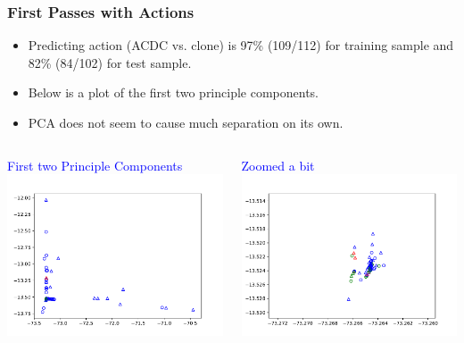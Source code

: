 \documentclass{beamer}
\begin{document}
\begin{frame}
  \frametitle{First Passes with Actions}
  \begin{itemize}
  \item Predicting action (ACDC vs. clone) is 97\% (109/112) for training sample
    and 82\% (84/102) for test sample.
  \item Below is a plot of the first two principle components.
  \item PCA does not seem to cause much separation on its own.
  \end{itemize}

  \begin{columns}
    \begin{column}{0.5\linewidth}
      \centering
      \textcolor{blue}{First two Principle Components} \\
      \includegraphics[width=\linewidth]{full.pdf}
    \end{column}
    \begin{column}{0.5\linewidth}
      \centering
      \textcolor{blue}{Zoomed a bit} \\
      \includegraphics[width=\linewidth]{zoomed.pdf}
      \end{column}
  \end{columns}


\end{frame}
\end{document}
